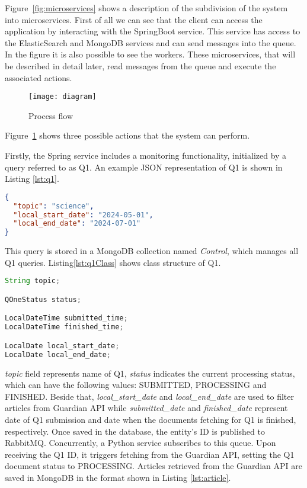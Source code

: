 Figure~\ref{fig:microservices} shows a description of the subdivision of
the system into microservices. First of all we can see that the client can
access the application by interacting with the SpringBoot service.
This service has access to the ElasticSearch and MongoDB services and can
send messages into the queue. In the figure it is also possible to see
the workers. These microservices, that will be described in detail
later, read messages from the queue and execute the associated actions.

\clearpage

\begin{figure}[ht]
    \centering
    \texttt{[image: diagram]}
    \caption{Process flow}
    \label{fig:flow}
\end{figure}

Figure~\ref{fig:flow} shows three possible actions that the system can perform.

Firstly, the Spring service includes a monitoring functionality, initialized by a query referred to as Q1. An
example JSON representation of Q1 is shown in Listing \ref{lst:q1}.

\begin{lstlisting}[language=json, caption={JSON representation of Q1}, label={lst:q1}]
{
  "topic": "science",
  "local_start_date": "2024-05-01",
  "local_end_date": "2024-07-01"
}
\end{lstlisting}

This query is stored in a MongoDB collection named \textit{Control}, which manages all Q1 queries.
Listing\ref{lst:q1Class} shows class structure of Q1.

\begin{lstlisting}[language=Java, caption={Class definition of QOne}, label={lst:q1Class}]
String topic;

QOneStatus status;

LocalDateTime submitted_time;
LocalDateTime finished_time;

LocalDate local_start_date;
LocalDate local_end_date;
\end{lstlisting}

\textit{topic} field represents name of Q1, \textit{status} indicates the current processing status, which can
have the following values: SUBMITTED, PROCESSING and FINISHED. Beside that, \textit{local\_start\_date} and
\textit{local\_end\_date} are used to filter articles from Guardian API while \textit{submitted\_date} and
\textit{finished\_date} represent date of Q1 submission and date when the documents fetching for Q1 is finished,
respectively. Once saved in the database, the entity's ID is published to RabbitMQ.
\newline
Concurrently, a Python service subscribes to this queue. Upon receiving the Q1 ID, it triggers fetching from
the Guardian API, setting the Q1 document status to PROCESSING. Articles retrieved from the Guardian API are saved
in MongoDB in the format shown in Listing \ref{lst:article}.

